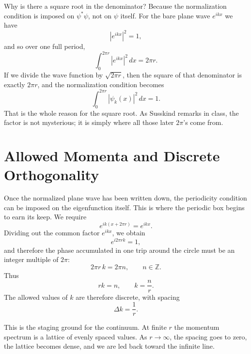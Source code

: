 Why is there a square root in the denominator? Because the normalization condition is imposed on \(\psi^*\psi\), not on \(\psi\) itself. For the bare plane wave \(e^{ikx}\) we have
\begin{equation}
|e^{ikx}|^2=1,
\end{equation}
and so over one full period,
\begin{equation}
\int_0^{2\pi r} |e^{ikx}|^2\,dx = 2\pi r.
\end{equation}
If we divide the wave function by \(\sqrt{2\pi r}\), then the square of that denominator is exactly \(2\pi r\), and the normalization condition becomes
\begin{equation}
\int_0^{2\pi r} |\psi_k(x)|^2\,dx = 1.
\end{equation}
That is the whole reason for the square root. As Susskind remarks in class, the factor is not mysterious; it is simply where all those later \(2\pi\)'s come from.

\section{Allowed Momenta and Discrete Orthogonality}

Once the normalized plane wave has been written down, the periodicity condition can be imposed on the eigenfunction itself. This is where the periodic box begins to earn its keep. We require
\begin{equation}
e^{ik(x+2\pi r)}=e^{ikx}.
\end{equation}
Dividing out the common factor \(e^{ikx}\), we obtain
\begin{equation}
e^{i2\pi rk}=1,
\end{equation}
and therefore the phase accumulated in one trip around the circle must be an integer multiple of \(2\pi\):
\begin{equation}
2\pi r\,k = 2\pi n,
\qquad n\in \mathbb{Z}.
\end{equation}
Thus
\begin{equation}
rk=n,
\qquad
k=\frac{n}{r}.
\end{equation}
The allowed values of \(k\) are therefore discrete, with spacing
\begin{equation}
\Delta k=\frac{1}{r}.
\end{equation}

This is the staging ground for the continuum. At finite \(r\) the momentum spectrum is a lattice of evenly spaced values. As \(r\to\infty\), the spacing goes to zero, the lattice becomes dense, and we are led back toward the infinite line.

